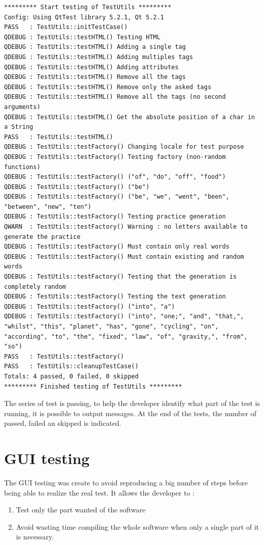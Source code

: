 \begin{lstlisting}
********* Start testing of TestUtils *********
Config: Using QtTest library 5.2.1, Qt 5.2.1
PASS   : TestUtils::initTestCase()
QDEBUG : TestUtils::testHTML() Testing HTML 
QDEBUG : TestUtils::testHTML() Adding a single tag 
QDEBUG : TestUtils::testHTML() Adding multiples tags 
QDEBUG : TestUtils::testHTML() Adding attributes 
QDEBUG : TestUtils::testHTML() Remove all the tags 
QDEBUG : TestUtils::testHTML() Remove only the asked tags 
QDEBUG : TestUtils::testHTML() Remove all the tags (no second arguments) 
QDEBUG : TestUtils::testHTML() Get the absolute position of a char in a String 
PASS   : TestUtils::testHTML()
QDEBUG : TestUtils::testFactory() Changing locale for test purpose 
QDEBUG : TestUtils::testFactory() Testing factory (non-random functions) 
QDEBUG : TestUtils::testFactory() ("of", "do", "off", "food") 
QDEBUG : TestUtils::testFactory() ("be") 
QDEBUG : TestUtils::testFactory() ("be", "we", "went", "been", "between", "new", "ten") 
QDEBUG : TestUtils::testFactory() Testing practice generation 
QWARN  : TestUtils::testFactory() Warning : no letters available to generate the practice 
QDEBUG : TestUtils::testFactory() Must contain only real words 
QDEBUG : TestUtils::testFactory() Must contain existing and random words 
QDEBUG : TestUtils::testFactory() Testing that the generation is completely random 
QDEBUG : TestUtils::testFactory() Testing the text generation 
QDEBUG : TestUtils::testFactory() ("into", "a") 
QDEBUG : TestUtils::testFactory() ("into", "one;", "and", "that,", "whilst", "this", "planet", "has", "gone", "cycling", "on", "according", "to", "the", "fixed", "law", "of", "gravity,", "from", "so") 
PASS   : TestUtils::testFactory()
PASS   : TestUtils::cleanupTestCase()
Totals: 4 passed, 0 failed, 0 skipped
********* Finished testing of TestUtils *********
\end{lstlisting}
The series of test is passing, to help the developer identify what part of the test is running, it is possible to output messages.
At the end of the tests, the number of passed, failed an skipped is indicated.

\chapter{GUI testing}
The GUI testing was create to avoid reproducing a big number of steps before being able to realize the real test. It allows the developer to :
\begin{enumerate}
	\item Test only the part wanted of the software
	\item Avoid wasting time compiling the whole software when only a single part of it is necessary.
\end{enumerate}

